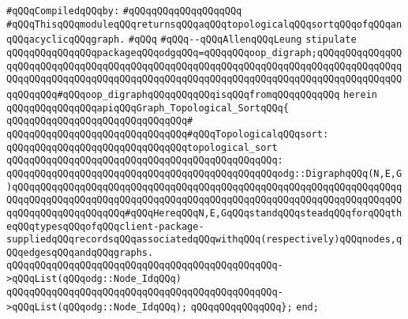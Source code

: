 \label{src/lib/graph/graph-topological-sort.api}
\newline
\verb|#qQQqCompiledqQQqby:|\newline
\verb|#qQQqqQQqqQQqqQQqqQQq|\newline
\newline
\verb|#qQQqThisqQQqmoduleqQQqreturnsqQQqaqQQqtopologicalqQQqsortqQQqofqQQqanqQQqacyclicqQQqgraph.|\newline
\verb|#qQQq|\newline
\verb|#qQQq--qQQqAllenqQQqLeung|\newline
\newline
\newline
\verb|stipulate|\newline
\verb|qQQqqQQqqQQqqQQqpackageqQQqodgqQQq=qQQqqQQqoop_digraph;qQQqqQQqqQQqqQQqqQQqqQQqqQQqqQQqqQQqqQQqqQQqqQQqqQQqqQQqqQQqqQQqqQQqqQQqqQQqqQQqqQQqqQQqqQQqqQQqqQQqqQQqqQQqqQQqqQQqqQQqqQQqqQQqqQQqqQQqqQQqqQQqqQQqqQQqqQQqqQQqqQQq#qQQqoop_digraphqQQqqQQqqQQqisqQQqfromqQQqqQQqqQQq|\newline
\verb|herein|\newline
\newline
\verb|qQQqqQQqqQQqqQQqapiqQQqGraph_Topological_SortqQQq{|\newline
\verb|qQQqqQQqqQQqqQQqqQQqqQQqqQQqqQQq#|\newline
\verb|qQQqqQQqqQQqqQQqqQQqqQQqqQQqqQQq#qQQqTopologicalqQQqsort:|\newline
\newline
\verb|qQQqqQQqqQQqqQQqqQQqqQQqqQQqqQQqtopological_sort|\newline
\verb|qQQqqQQqqQQqqQQqqQQqqQQqqQQqqQQqqQQqqQQqqQQqqQQq:|\newline
\verb|qQQqqQQqqQQqqQQqqQQqqQQqqQQqqQQqqQQqqQQqqQQqqQQqodg::DigraphqQQq(N,E,G)qQQqqQQqqQQqqQQqqQQqqQQqqQQqqQQqqQQqqQQqqQQqqQQqqQQqqQQqqQQqqQQqqQQqqQQqqQQqqQQqqQQqqQQqqQQqqQQqqQQqqQQqqQQqqQQqqQQqqQQqqQQqqQQqqQQqqQQqqQQqqQQqqQQqqQQqqQQqqQQq#qQQqHereqQQqN,E,GqQQqstandqQQqsteadqQQqforqQQqtheqQQqtypesqQQqofqQQqclient-package-suppliedqQQqrecordsqQQqassociatedqQQqwithqQQq(respectively)qQQqnodes,qQQqedgesqQQqandqQQqgraphs.|\newline
\verb|qQQqqQQqqQQqqQQqqQQqqQQqqQQqqQQqqQQqqQQqqQQqqQQq->qQQqList(qQQqodg::Node_IdqQQq)|\newline
\verb|qQQqqQQqqQQqqQQqqQQqqQQqqQQqqQQqqQQqqQQqqQQqqQQq->qQQqList(qQQqodg::Node_IdqQQq);|\newline
\verb|qQQqqQQqqQQqqQQq};|\newline
\verb|end;|\newline

